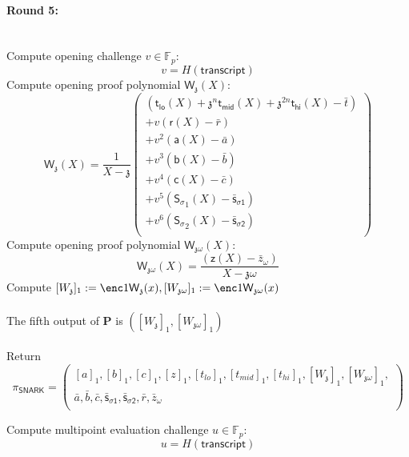 \documentclass[11pt]{article} %
\newcommand{\F}{\ensuremath{\mathbb F}\xspace}
\newcommand{\chalpoint}{\ensuremath{\mathfrak{z}}\xspace}
\newcommand{\prv}{\ensuremath{\mathsf{\mathbf{P}}}\xspace}
\newcommand{\sigpoly}{\ensuremath{\mathsf{S_{\sigma}}}\xspace}
\newcommand{\sigpolyevala}{\ensuremath{\mathsf{\bar{s}_{\sigma1}}}\xspace}
\newcommand{\sigpolyevalb}{\ensuremath{\mathsf{\bar{s}_{\sigma2}}}\xspace}
\newcommand{\lpoly}{\ensuremath{\mathsf{a}}\xspace}
\newcommand{\rpoly}{\ensuremath{\mathsf{b}}\xspace}
\newcommand{\opoly}{\ensuremath{\mathsf{c}}\xspace}
\newcommand{\idpermpoly}{\ensuremath{\mathsf{z}}\xspace}
\newcommand{\snark}{\ensuremath{\mathsf{snark(\lambda)}}\xspace}
\newcommand{\Prove}{\mathcal{P}}
\newcommand{\Psnark}{\prv}%
\newcommand{\transcript}{\ensuremath{\mathsf{transcript}}\xspace}
\begin{document}
	\paragraph{\textbf{Round 5:}}\ \\
	Compute opening challenge $v \in \F_p:$
	$$
	v = H(\transcript)
	$$
	Compute opening proof polynomial $\mathsf{W_\chalpoint}(X):$
	$$
	\mathsf{W_\chalpoint}(X) = \frac{1}{X - \chalpoint} \left(
	\begin{array}{l}
	(\mathsf{t_{lo}}(X) + \chalpoint^n \mathsf{t_{mid}}(X) + \chalpoint^{2n}\mathsf{t_{hi}}(X) - \bar{t}) \\
	+ v(\mathsf{r}(X) - \bar{r}) \\
	+ v^2(\lpoly(X) - \bar{a}) \\
	+ v^3(\rpoly(X) - \bar{b}) \\
	+ v^4(\opoly(X) - \bar{c}) \\
	+ v^5(\sigpoly_1(X) - \sigpolyevala) \\
	+ v^6(\sigpoly_2(X) - \sigpolyevalb) \\
	\end{array}
	\right)
	$$
	Compute opening proof polynomial $\mathsf{W_{\chalpoint\omega}}(X):$
	$$
	\mathsf{W_{\chalpoint \omega}}(X) = \frac{(\idpermpoly(X) - \bar{z}_\omega)}{X - \chalpoint \omega}
	$$
	Compute $[W_\chalpoint]_1 := \enc1{\mathsf{W_\chalpoint}(x)}, [W_{\chalpoint \omega}]_1 := \enc1{\mathsf{W_{\chalpoint \omega}}(x)}$ \\ \\

	The fifth output of $\Psnark$ is $([W_\chalpoint]_1, [W_{\chalpoint\omega}]_1)$
	\\ \\
	Return
	$$
	\pi_{\mathsf{SNARK}} = \left(
	\begin{array}{c}
	[a]_1, [b]_1, [c]_1, [z]_1, [t_{lo}]_1, [t_{mid}]_1, [t_{hi}]_1, [W_\chalpoint]_1, [W_{\chalpoint \omega}]_1, \\
	\bar{a}, \bar{b}, \bar{c}, \sigpolyevala, \sigpolyevalb, \bar{r}, \bar{z}_\omega \\
	\end{array}
	\right)
	$$
	
	Compute multipoint evaluation challenge $u \in \F_p:$
	$$
	u = H(\transcript)
	$$
\end{document}
